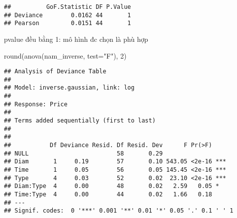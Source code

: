 \documentclass[
]{article}
\newenvironment{Shaded}{\begin{snugshade}}{\end{snugshade}}
\newcommand{\AttributeTok}[1]{\textcolor[rgb]{0.77,0.63,0.00}{#1}}
\newcommand{\ConstantTok}[1]{\textcolor[rgb]{0.00,0.00,0.00}{#1}}
\newcommand{\DecValTok}[1]{\textcolor[rgb]{0.00,0.00,0.81}{#1}}
\newcommand{\FunctionTok}[1]{\textcolor[rgb]{0.00,0.00,0.00}{#1}}
\newcommand{\NormalTok}[1]{#1}
\newcommand{\OtherTok}[1]{\textcolor[rgb]{0.56,0.35,0.01}{#1}}
\newcommand{\SpecialCharTok}[1]{\textcolor[rgb]{0.00,0.00,0.00}{#1}}
\newcommand{\StringTok}[1]{\textcolor[rgb]{0.31,0.60,0.02}{#1}}
\begin{document}
\begin{Shaded}
\end{Shaded}

\begin{verbatim}
##          GoF.Statistic DF P.Value
## Deviance        0.0162 44       1
## Pearson         0.0151 44       1
\end{verbatim}

pvalue đều bằng 1: mô hình đc chọn là phù hợp

\begin{Shaded}
\begin{Highlighting}[]
\FunctionTok{round}\NormalTok{(}\FunctionTok{anova}\NormalTok{(nam\_inverse, }\AttributeTok{test=}\StringTok{"F"}\NormalTok{), }\DecValTok{2}\NormalTok{)}
\end{Highlighting}
\end{Shaded}

\begin{verbatim}
## Analysis of Deviance Table
## 
## Model: inverse.gaussian, link: log
## 
## Response: Price
## 
## Terms added sequentially (first to last)
## 
## 
##           Df Deviance Resid. Df Resid. Dev      F Pr(>F)    
## NULL                         58       0.29                  
## Diam       1     0.19        57       0.10 543.05 <2e-16 ***
## Time       1     0.05        56       0.05 145.45 <2e-16 ***
## Type       4     0.03        52       0.02  23.10 <2e-16 ***
## Diam:Type  4     0.00        48       0.02   2.59   0.05 *  
## Time:Type  4     0.00        44       0.02   1.66   0.18    
## ---
## Signif. codes:  0 '***' 0.001 '**' 0.01 '*' 0.05 '.' 0.1 ' ' 1
\end{verbatim}
\end{document}
